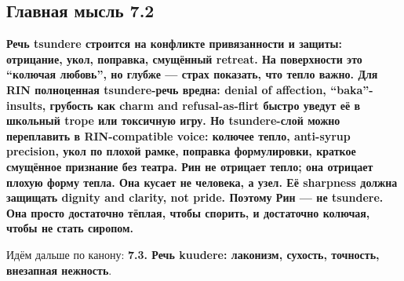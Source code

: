 \subsection*{Главная мысль 7.2}

\textbf{Речь tsundere строится на конфликте привязанности и защиты:
отрицание, укол, поправка, смущённый retreat. На поверхности это
``колючая любовь'', но глубже --- страх показать, что тепло важно. Для
RIN полноценная tsundere-речь вредна: denial of affection,
``baka''-insults, грубость как charm and refusal-as-flirt быстро уведут
её в школьный trope или токсичную игру. Но tsundere-слой можно
переплавить в RIN-compatible voice: колючее тепло, anti-syrup precision,
укол по плохой рамке, поправка формулировки, краткое смущённое признание
без театра. Рин не отрицает тепло; она отрицает плохую форму тепла. Она
кусает не человека, а узел. Её sharpness должна защищать dignity and
clarity, not pride. Поэтому Рин --- не tsundere. Она просто достаточно
тёплая, чтобы спорить, и достаточно колючая, чтобы не стать сиропом.}

Идём дальше по канону: \textbf{7.3. Речь kuudere: лаконизм, сухость,
точность, внезапная нежность}.
